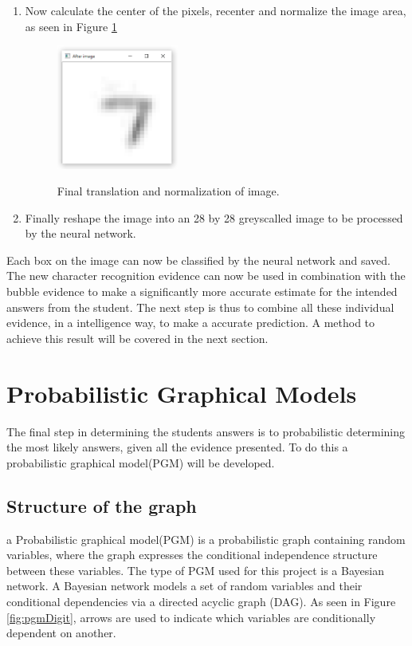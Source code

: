 \begin{enumerate}
\item Now calculate the center of the pixels, recenter and normalize the image area, as seen in Figure \ref{fig:final}

\begin{figure}
  \centering
  \includegraphics[width=4cm]{TranslateAndScale}\\
  \caption{Final translation and normalization of image.}
  \label{fig:final}
\end{figure}

\item Finally reshape the image into an 28 by 28 greyscalled image to be processed by the neural network.
\end{enumerate}

Each box on the image can now be classified by the neural network and  saved. The new character recognition evidence can now be used in combination with the bubble evidence to make a significantly more accurate estimate for the intended answers from the student. The next step is thus to combine all these individual evidence, in a intelligence way, to make a accurate prediction. A method to achieve this result will be covered in the next section.

\section{Probabilistic Graphical Models}
\label{sec:PGM}

The final step in determining the students answers is to probabilistic determining the most likely answers, given all the evidence presented. To do this a probabilistic graphical model(PGM) will be developed.

\subsection{Structure of the graph}

a Probabilistic graphical model(PGM) is a probabilistic graph containing random variables, where the graph expresses the conditional independence structure between these variables. The type of PGM used for this project is a Bayesian network. A Bayesian network models a set of random variables and their conditional dependencies via a directed acyclic graph (DAG). As seen in Figure \ref{fig:pgmDigit}, arrows are used to indicate which variables are conditionally dependent on another. 

